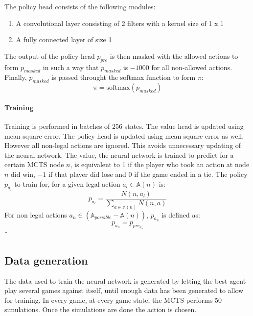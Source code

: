 \documentclass[12pt]{article}
\begin{document}
The policy head consists of the following modules:
\begin{enumerate}
\item A convolutional layer consisting of 2 filters with a kernel size of 1 x 1
\item A fully connected layer of size 1
\end{enumerate}
The output of the policy head \(p_{pre}\) is then masked with the allowed actions to form \(p_{masked}\) in such a way that \(p_{masked}\) is \(-1000\) for all non-allowed actions. Finally, \(p_{masked}\) is passed throught the softmax function to form \(\pi\):
\begin{equation}\label{eq:nn:policyDefinition}
\pi = \text{softmax}(p_{masked})
\end{equation}

\paragraph{Training}\label{sec:Methods:NN:A0:Training}
Training is performed in batches of \(256\) states. The value head is updated using mean square error. The policy head is updated using mean square error as well. However all non-legal actions are ignored. This avoids unnecessary updating of the neural network. The value, the neural network is trained to predict for a certain MCTS node \(n\), is equivalent to 1 if the player who took an action at node \(n\) did win, \(-1\) if that player did lose and \(0\) if the game ended in a tie. The policy \(p_{a_l}\) to train for, for a given legal action \(a_l \in \mathbb A(n)\) is:
\begin{equation} \label{eq:NN:policy_computation}
p_{a_l} = \frac{N(n, a_l)}{\sum_{a\in \mathbb A(n)} N(n, a)}
\end{equation}
For non legal actions \(a_n \in (\mathbb A_{possible} - \mathbb A(n))\), \(p_{a_n}\) is defined as:
\begin{equation} \label{eq:NN:policy_computation_nonlegal}
p_{a_n} = p_{pre_{a_n}}
\end{equation}ˇ


\subsection{Data generation}
The data used to train the neural network is generated by letting the best agent play several games against itself, until enough data has been generated to allow for training. In every game, at every game state, the MCTS performs 50 simulations. Once the simulations are done the action is chosen.
\end{document}
